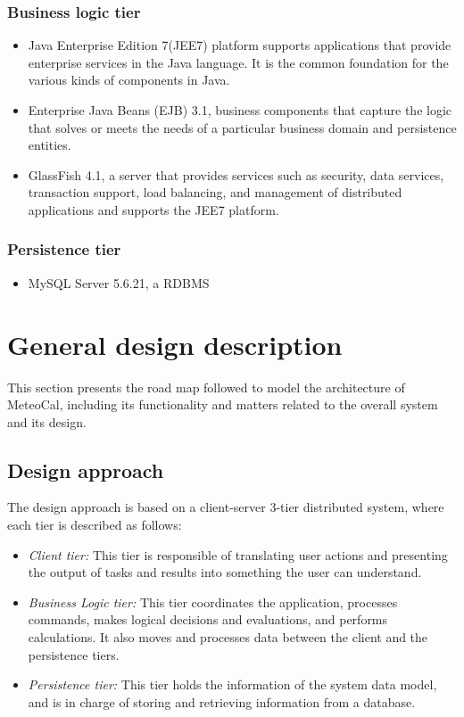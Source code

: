 \documentclass[10pt,a4paper,titlepage]{article}
\begin{document}
\subsubsection{Business logic tier}
\begin{itemize}
\item Java Enterprise Edition 7(JEE7) platform supports applications that provide enterprise services in the Java language. It is the common foundation for the various kinds of components in Java.
\item Enterprise Java Beans (EJB) 3.1, business components that capture the logic that solves or meets the needs of a particular business domain and persistence entities.
\item GlassFish 4.1, a server that provides services such as security, data services, transaction support, load balancing, and management of distributed applications and supports the JEE7 platform.
\end{itemize}

\subsubsection{Persistence tier}
\begin{itemize}
\item MySQL Server 5.6.21, a RDBMS
\end{itemize}

\section{General design description}
This section presents the road map followed to model the architecture of MeteoCal, including its functionality and matters related to the overall system and its design.

\subsection{Design approach}
The design approach is based on a client-server 3-tier distributed system, where each tier is described as follows:
\begin{itemize}
\item \emph{Client tier:} This tier is responsible of translating user actions and presenting the output of tasks and results into something the user can understand.
\item \emph{Business Logic tier:} This tier coordinates the application, processes commands, makes logical decisions and evaluations, and performs calculations. It also moves and processes data between the client and the persistence tiers.
\item \emph{Persistence tier:} This tier holds the information of the system data model, and is in charge of storing and retrieving information from a database. 
\end{itemize}
\end{document}
